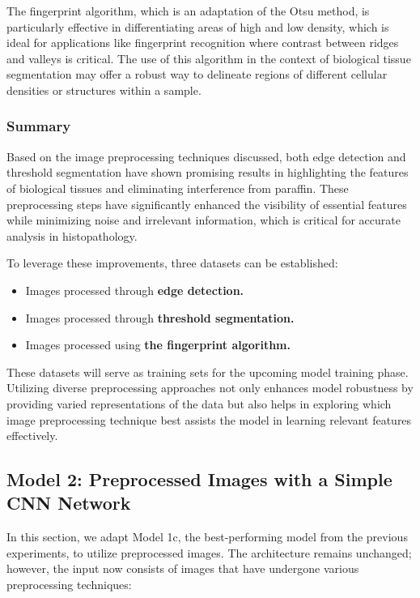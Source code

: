 The fingerprint algorithm, which is an adaptation of the Otsu method, is particularly effective in differentiating areas of high and low density, which is ideal for applications like fingerprint recognition where contrast between ridges and valleys is critical. The use of this algorithm in the context of biological tissue segmentation may offer a robust way to delineate regions of different cellular densities or structures within a sample.

\subsubsection{Summary}

Based on the image preprocessing techniques discussed, both edge detection and threshold segmentation have shown promising results in highlighting the features of biological tissues and eliminating interference from paraffin. These preprocessing steps have significantly enhanced the visibility of essential features while minimizing noise and irrelevant information, which is critical for accurate analysis in histopathology.

To leverage these improvements, three datasets can be established:

\begin{itemize}
    \item Images processed through \textbf{edge detection.}
    \item Images processed through \textbf{threshold segmentation.}
    \item Images processed using \textbf{the fingerprint algorithm.}
\end{itemize}

These datasets will serve as training sets for the upcoming model training phase. Utilizing diverse preprocessing approaches not only enhances model robustness by providing varied representations of the data but also helps in exploring which image preprocessing technique best assists the model in learning relevant features effectively.

\subsection{Model 2: Preprocessed Images with a Simple CNN Network}

In this section, we adapt Model 1c, the best-performing model from the previous experiments, to utilize preprocessed images. The architecture remains unchanged; however, the input now consists of images that have undergone various preprocessing techniques:

